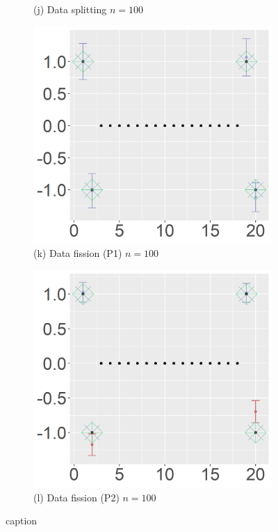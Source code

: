 \begin{figure}[ht!]
\begin{subfigure}[b]{.32\columnwidth}
    \caption{(j) Data splitting $n=100$}
\end{subfigure}
\hfill
\centering
\begin{subfigure}[b]{.32\columnwidth} 
    \includegraphics[width=\columnwidth]{../../plot/p1_100_1_1.png}
    \caption{(k) Data fission (P1) $n=100$}
\end{subfigure}
\hfill
\centering
\begin{subfigure}[b]{.32\columnwidth} 
    \includegraphics[width=\columnwidth]{../../plot/p2_100_1_1.png}
    \caption{(l) Data fission (P2) $n=100$}
\end{subfigure}
\caption{caption}
\label{fig:individual}
\end{figure}